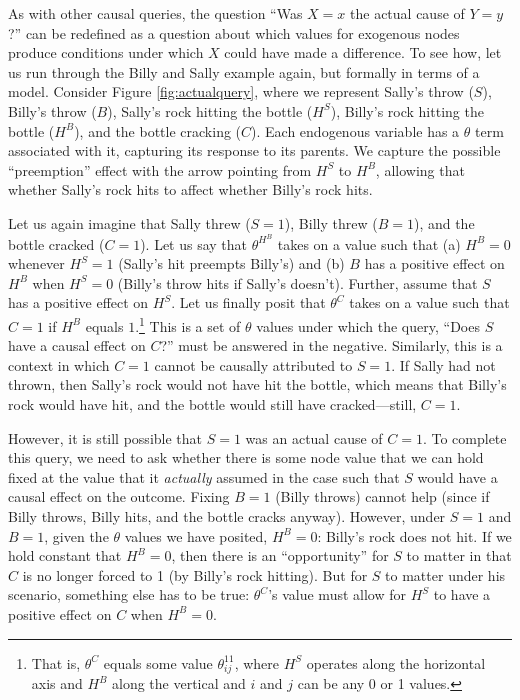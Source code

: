 \documentclass[12pt,]{book}
\let\rmarkdownfootnote\footnote%
\def\footnote{\protect\rmarkdownfootnote}
\begin{document}
As with other causal queries, the question ``Was \(X=x\) the actual cause of \(Y=y\)?'' can be redefined as a question about which values for exogenous nodes produce conditions under which \(X\) could have made a difference. To see how, let us run through the Billy and Sally example again, but formally in terms of a model. Consider Figure \ref{fig:actualquery}, where we represent Sally's throw (\(S\)), Billy's throw (\(B\)), Sally's rock hitting the bottle (\(H^S\)), Billy's rock hitting the bottle (\(H^B\)), and the bottle cracking (\(C\)). Each endogenous variable has a \(\theta\) term associated with it, capturing its response to its parents. We capture the possible ``preemption'' effect with the arrow pointing from \(H^S\) to \(H^B\), allowing that whether Sally's rock hits to affect whether Billy's rock hits.

Let us again imagine that Sally threw (\(S=1\)), Billy threw (\(B=1\)), and the bottle cracked (\(C=1\)). Let us say that \(\theta^{H^B}\) takes on a value such that (a) \(H^B=0\) whenever \(H^S=1\) (Sally's hit preempts Billy's) and (b) \(B\) has a positive effect on \(H^B\) when \(H^S=0\) (Billy's throw hits if Sally's doesn't). Further, assume that \(S\) has a positive effect on \(H^S\). Let us finally posit that \(\theta^C\) takes on a value such that \(C=1\) if \(H^B\) equals \(1\).\footnote{That is, \(\theta^C\) equals some value \(\theta_{ij}^{11}\), where \(H^S\) operates along the horizontal axis and \(H^B\) along the vertical and \(i\) and \(j\) can be any 0 or 1 values.} This is a set of \(\theta\) values under which the query, ``Does \(S\) have a causal effect on \(C\)?'' must be answered in the negative. Similarly, this is a context in which \(C=1\) cannot be causally attributed to \(S=1\). If Sally had not thrown, then Sally's rock would not have hit the bottle, which means that Billy's rock would have hit, and the bottle would still have cracked---still, \(C=1\).

However, it is still possible that \(S=1\) was an actual cause of \(C=1\). To complete this query, we need to ask whether there is some node value that we can hold fixed at the value that it \emph{actually} assumed in the case such that \(S\) would have a causal effect on the outcome. Fixing \(B=1\) (Billy throws) cannot help (since if Billy throws, Billy hits, and the bottle cracks anyway). However, under \(S=1\) and \(B=1\), given the \(\theta\) values we have posited, \(H^B=0\): Billy's rock does not hit. If we hold constant that \(H^B=0\), then there is an ``opportunity'' for \(S\) to matter in that \(C\) is no longer forced to 1 (by Billy's rock hitting). But for \(S\) to matter under his scenario, something else has to be true: \(\theta^C\)'s value must allow for \(H^S\) to have a positive effect on \(C\) when \(H^B=0\).
\end{document}
